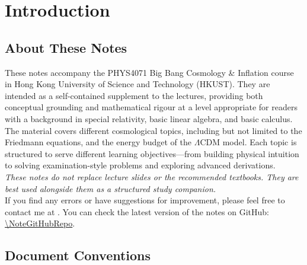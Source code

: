 
\chapter*{Introduction}
{}


\section*{About These Notes}
{}

These notes accompany the PHYS4071 Big Bang Cosmology \& Inflation course in Hong Kong University of Science and Technology (HKUST).
They are intended as a self-contained supplement to the lectures,
providing both conceptual grounding and mathematical rigour at a level
appropriate for readers with a background in special relativity, basic linear algebra, and basic calculus. \\

The material covers different cosmological topics, including but not limited to the Friedmann equations, and the
energy budget of the $\Lambda$CDM model.
Each topic is structured to serve different learning objectives---from building
physical intuition to solving examination-style problems and exploring
advanced derivations. \\

\textit{These notes do not replace lecture slides or the recommended textbooks.
They are best used alongside them as a structured study companion.} \\

If you find any errors or have suggestions for improvement, please feel free to contact me at \texttt{\NoteAuthorEmail}. You can check the latest version of the notes on GitHub: \url{\NoteGitHubRepo}.

\section*{Document Conventions}
{}

